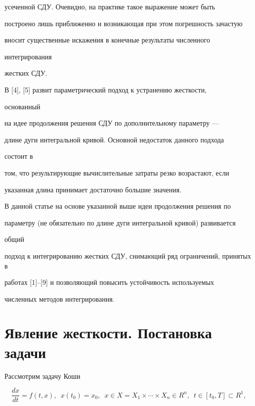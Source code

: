 усеченной СДУ. Очевидно, на практике такое выражение может быть 


построено лишь приближенно и возникающая при этом погрешность зачастую 


вносит существенные искажения в конечные результаты численного 


интегрирования 


жестких СДУ. 


В [4], [5] развит параметрический подход к устранению жесткости, 


основанный 


на идее продолжения решения СДУ по дополнительному параметру --- 


длине дуги интегральной кривой. Основной недостаток данного подхода 


состоит в 


том, что результирующие вычислительные затраты резко возрастают, если 


указанная длина принимает достаточно большие значения. 


 


В данной статье на основе указанной выше идеи продолжения решения по 


параметру (не обязательно по длине дуги интегральной кривой) развивается 


общий 


подход к интегрированию жестких СДУ, снимающий ряд ограничений, принятых в 


работах [1]--[9] и позволяющий повысить устойчивость используемых 


численных методов интегрирования. 


 


\section{Явление жесткости. Постановка задачи} 


 


Рассмотрим задачу Коши 


\begin{equation} 


\frac{dx}{dt}=f(t,x),\ \; x(t_0)=x_0,\ \; x\in X= 


X_1\times\dotsb\times X_n\in R^n,\ \; t\in[t_0,T]\subset R^1, 


\end{equation} 


